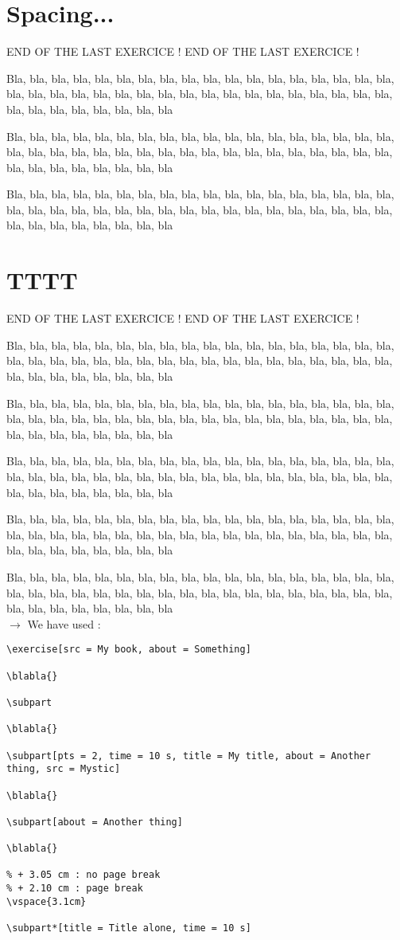 \documentclass[12pt]{article}
\newcommand\blabla{%
		\noindent Bla, bla, bla, bla, bla, bla, bla, bla, bla, bla, bla,
		bla, bla, bla, bla, bla, bla, bla, bla, bla, bla, bla,
		bla, bla, bla, bla, bla, bla, bla, bla, bla, bla, bla,
		bla, bla, bla, bla, bla, bla, bla, bla, bla, bla, bla
	}
\newcommand\codeused{
		\blabla{} \medskip  \\ \noindent $\rightarrow$ We have used :
	}
\begin{document}
\newpage\section{Spacing...}

\noindent END OF THE LAST EXERCICE ! END OF THE LAST EXERCICE !

\exercise

\blabla{}

\subpart*[title=Un long titre pour bien tester...]

\blabla{}


\exercise

\subpart*[title=Un long titre pour bien tester...]

\blabla{}



\newpage\section{TTTT}

\noindent END OF THE LAST EXERCICE ! END OF THE LAST EXERCICE !

\exercise[src = My book, about = Something]
      
\blabla{}

\subpart

\blabla{}

\subpart[pts = 2, time = 10 s, title = My title, about = Another thing, src = Mystic]

\blabla{}

\subpart[about = Another thing]

\blabla{}


\subpart*[title = Title alone, time = 10 s]


\codeused{}

\begin{verbatim}
\exercise[src = My book, about = Something]
      
\blabla{}

\subpart

\blabla{}

\subpart[pts = 2, time = 10 s, title = My title, about = Another thing, src = Mystic]

\blabla{}

\subpart[about = Another thing]

\blabla{}

% + 3.05 cm : no page break
% + 2.10 cm : page break
\vspace{3.1cm}

\subpart*[title = Title alone, time = 10 s]\end{verbatim}
\end{document}
